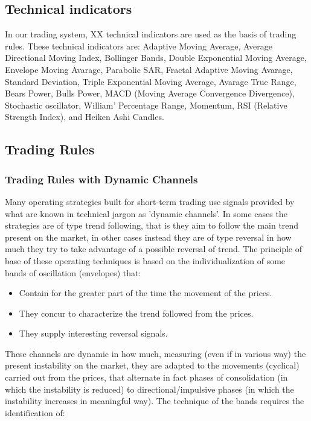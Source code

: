\subsection{Technical indicators}
In our trading system, XX technical indicators are used as the basis of trading rules. These technical indicators are: Adaptive Moving Average, Average Directional Moving Index, Bollinger Bands, Double Exponential Moving Average, Envelope Moving Avarage, Parabolic SAR, Fractal Adaptive Moving Avarage, Standard Deviation, Triple Exponential Moving Average, Avarage True Range, Bears Power, Bulls Power, MACD (Moving Average Convergence Divergence), Stochastic oscillator, William' Percentage Range, Momentum, RSI (Relative Strength Index), and Heiken Ashi Candles.

\subsection{Trading Rules}

\subsubsection{Trading Rules with Dynamic Channels}

Many operating strategies built for short-term trading use signals provided by what are known in technical jargon as 'dynamic channels'. In some cases the strategies are of type trend following, that is they aim to follow the main trend present on the market, in other cases instead they are of type reversal in how much they try to take advantage of a possible reversal of trend.
The principle of base of these operating techniques is based on the individualization of some bands of oscillation (envelopes) that:

\begin{itemize}
\setlength\itemsep{0.3em}
\item Contain for the greater part of the time the movement of the prices.
\item They concur to characterize the trend followed from the prices.
\item They supply interesting reversal signals.
\end{itemize}

These channels are dynamic in how much, measuring (even if in various way) the present instability on the market, they are adapted to the movements (cyclical) carried out from the prices, that alternate in fact phases of consolidation (in which the instability is reduced) to directional/impulsive phases (in which the instability increases in meaningful way). The technique of the bands requires the identification of:

